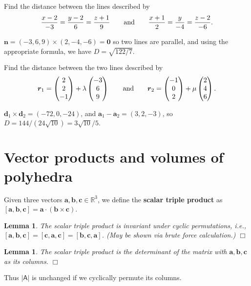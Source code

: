 \documentclass[letter-paper]{tufte-book}
\newtheorem{lemma}[theorem]{\color{pastel-blue}Lemma}
\newenvironment{example}[1][Example]{\begin{trivlist}
\item[\hskip \labelsep {\bfseries #1}]}{\end{trivlist}}
\newcommand{\ab}{\boldsymbol{a}}
\newcommand{\bb}{\boldsymbol{b}}
\newcommand{\cb}{\boldsymbol{c}}
\newcommand{\db}{\boldsymbol{d}}
\newcommand{\nb}{\boldsymbol{n}}
\newcommand\Def[1]{\textbf{#1}}
\newcommand{\qedwhite}{\hfill \ensuremath{\Box}}
\begin{document}
\begin{example}
	Find the distance between the lines described by
	\begin{equation*}
		\frac{x-2}{-3}=\frac{y-2}{6}=\frac{z+1}{9}\qquad\textnormal{and}\qquad
		\frac{x+1}{2}=\frac{y}{-4}=\frac{z-2}{-6}.
	\end{equation*}
	
	$\nb=(-3,6,9)\times(2,-4,-6)=\boldsymbol{0}$ so two lines are parallel, and
	using the appropriate formula, we have $D=\sqrt{122/7}$.
\end{example}
\begin{example}
	Find the distance between the two lines described by
	\begin{equation*}
		\boldsymbol{r}_1=\begin{pmatrix}2\\2\\-1\end{pmatrix}
		+\lambda\begin{pmatrix}-3\\6\\9\end{pmatrix}\qquad\textnormal{and}\qquad
		\boldsymbol{r}_2=\begin{pmatrix}-1\\0\\2\end{pmatrix}
		+\mu\begin{pmatrix}2\\4\\6\end{pmatrix}.
	\end{equation*}
	
	$\db_1\times\db_2=(-72,0,-24)$, and $\ab_1-\ab_2=(3,2,-3)$, so
	$D=144/(24\sqrt{10})=3\sqrt{10}/5$.
\end{example}


\section{Vector products and volumes of polyhedra}

Given three vectors $\ab,\bb,\cb\in\mathbb{R}^3$, we define the
\Def{scalar triple product} as $[\ab,\bb,\cb]=\ab\cdot(\bb\times\cb)$.
\begin{lemma}
	The scalar triple product is invariant under cyclic permutations, i.e.,
	$[\ab,\bb,\cb]=[\cb,\ab,\cb]=[\bb,\cb,\ab]$. (May be shown via brute force
	calculation.) \qedwhite
\end{lemma}
\begin{lemma}
	The scalar triple product is the determinant of the matrix with
	$\ab,\bb,\cb$ as its columns. \qedwhite
\end{lemma}
Thus $|\mathsf{A}|$ is unchanged if we cyclically permute its columns.
\end{document}
